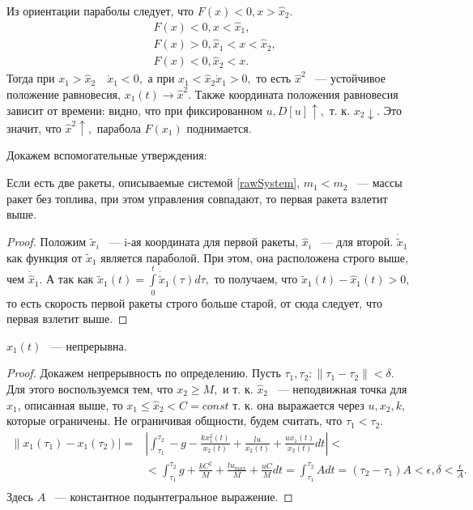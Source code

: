 \documentclass[10pt,pdf,hyperref={unicode}]{beamer}
\begin{document}
	Из ориентации параболы следует, что $F(x) < 0, x > \hat x_2.$
	\[
	\begin{aligned}
	& F(x) < 0, x < \hat x_1,\\
	& F(x) > 0, \hat x_1 < x < \hat x_2,\\
	& F(x) < 0, \hat x_2 < x.
	\end{aligned}
	\]
	Тогда при $x_1 > \hat x_2 \quad \dot x_1 < 0,$ а при $x_1 < \hat x_2 \dot x_1 > 0,$ то есть 
	$\hat x^2$ ~--- устойчивое положение равновесия, $x_1(t) \to \hat x^2.$ 
	Также координата положения равновесия зависит от времени:
	видно, что при фиксированном $u, D[u] \uparrow,$ т. к. $x_2 \downarrow.$
	Это значит, что $\hat x^2 \uparrow,$ парабола $F(x_1)$ поднимается.

	Докажем вспомогательные утверждения:
	\begin{propos}\label{mainProp}
	Если есть две ракеты, описываемые системой \eqref{rawSystem}, $m_1 < m_2$ ~--- массы ракет без топлива,
	при этом управления совпадают, то первая ракета взлетит выше.
	\end{propos}
	\begin{proof}
	Положим $\tilde x_i$ ~--- i-ая координата для первой ракеты, $\hat x_i$ ~--- для второй.
	$\dot {\tilde x}_1$ как функция от $\tilde x_1$ является параболой. При этом, она расположена строго выше, чем
	$\dot {\hat x}_1.$ А так как $\tilde x_1(t) = \int \limits^{t}_{0} \dot {\tilde x}_1(\tau) d\tau,$ то получаем, что
	$\tilde x_1(t) - \hat x_1(t) > 0, $ то есть скорость первой ракеты строго больше старой, от сюда следует, что первая взлетит выше.
	\end{proof}

	\begin{propos}
	$x_1(t)$ ~--- непрерывна.
	\end{propos}
	\begin{proof}
	Докажем непрерывность по определению. Пусть $\tau_1, \tau_2: \|\tau_1 - \tau_2\| < \delta.$ 
	Для этого воспользуемся тем, что $x_2 \ge M,$ и т. к. $\hat x_2$ ~--- неподвижная точка для 
	$x_1$, описанная выше, то $x_1 \le \hat x_2 < C = const$ т. к. она выражается через $u, x_2, k,$
	которые ограничены. Не ограничивая общности, будем считать, что $\tau_1 < \tau_2.$
	\[
	\begin{aligned}
	\|  x_1(\tau_1) - x_1(\tau_2) | = 
	& \left| \int_{\tau_1}^{\tau_2} - g - \frac{kx_1^2(t)}{x_2(t)} + \frac{lu}{x_2(t)} + \frac{ux_1(t)}{x_2(t)} dt\right| < \\ 
	& < \int_{\tau_1}^{\tau_2}  g + \frac{kC^2}{M} + \frac{lu_{max}}{M} + \frac{uC}{M} dt = \int_{\tau_1}^{\tau_2} A dt = 
	(\tau_2 - \tau_1)A < \epsilon, \delta < \frac{\epsilon}{A}.\\
	\end{aligned}
	\]
	Здесь $A$ ~--- константное подынтегральное выражение. 

	\end{proof}
\end{document}
